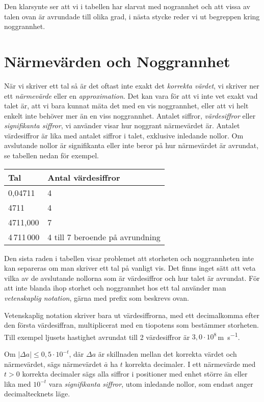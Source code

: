 \bigskip

Den klarsynte ser att vi i tabellen har slarvat med nogrannhet och att
vissa av talen ovan är avrundade till olika grad, i nästa stycke reder
vi ut begreppen kring noggrannhet.

\section{Närmevärden och Noggrannhet}

När vi skriver ett tal så är det oftast inte exakt det \emph{korrekta värdet},
vi skriver ner ett \emph{närmevärde} eller en \emph{approximation}.
Det kan vara för att vi inte vet exakt vad talet är, att vi bara kunnat mäta det
med en vis noggrannhet, eller att vi helt enkelt inte behöver mer än en viss
noggrannhet.
Antalet siffror, \emph{värdesiffror} eller \emph{signifikanta siffror}, vi
använder visar hur noggrant närmevärdet är.
Antalet värdesiffror är lika med antalet siffror i talet, exklusive inledande
nollor.
Om avslutande nollor är signifikanta eller inte beror på hur närmevärdet är
avrundat, se tabellen nedan för exempel.

\bigskip
\begin{centering}
\begin{tabular}{|l|l|}
\hline
Tal & Antal värdesiffror \\
\hline
0,04711 & 4\\
4711 & 4 \\
4711,000 & 7 \\
4\,711\,000 & 4 till 7 beroende på avrundning \\
\hline
\end{tabular}
\end{centering}
\bigskip

Den sista raden i tabellen visar problemet att storheten och noggrannheten inte
kan separeras om man skriver ett tal på vanligt vis.
Det finns inget sätt att veta vilka av de avslutande nollorna som är
värdesiffror och hur talet är avrundat.
För att inte blanda ihop storhet och noggrannhet hos ett tal använder man
\emph{vetenskaplig notation}, gärna med prefix som beskrevs ovan.

Vetenskaplig notation skriver bara ut värdesiffrorna, med ett
decimalkomma efter den första värdesiffran, multiplicerat med en
tiopotens som bestämmer storheten.
Till exempel ljusets hastighet avrundat till 2 värdesiffror är
$3,0 \cdot 10^8$\,\unit{\metre\per\second}.

Om $|\Delta a|\leq 0,5\cdot 10^{-t}$, där $\Delta a$ är skillnaden mellan det
korrekta värdet och närmevärdet, sägs närmevärdet $\bar {a}$ ha $t$ korrekta
decimaler.
I ett närmevärde med $t>0$ korrekta decimaler sägs alla siffror i
positioner med enhet större än eller lika med $10^{-t}$ vara
\emph{signifikanta siffror}, utom inledande nollor, som endast anger
decimaltecknets läge.

